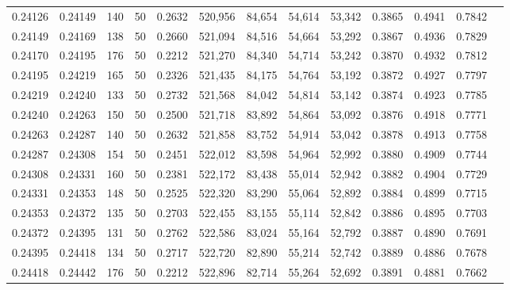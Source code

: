 \begin{tabular}{rrrrrrrrrrrrr}
0.24126 & 0.24149 &   140 &  50 &                                     0.2632 & 520,956 &  84,654 &  54,614 &  53,342 & 0.3865 & 0.4941 & 0.7842 \\
0.24149 & 0.24169 &   138 &  50 &                                     0.2660 & 521,094 &  84,516 &  54,664 &  53,292 & 0.3867 & 0.4936 & 0.7829 \\
0.24170 & 0.24195 &   176 &  50 &                                     0.2212 & 521,270 &  84,340 &  54,714 &  53,242 & 0.3870 & 0.4932 & 0.7812 \\
0.24195 & 0.24219 &   165 &  50 &                                     0.2326 & 521,435 &  84,175 &  54,764 &  53,192 & 0.3872 & 0.4927 & 0.7797 \\
0.24219 & 0.24240 &   133 &  50 &                                     0.2732 & 521,568 &  84,042 &  54,814 &  53,142 & 0.3874 & 0.4923 & 0.7785 \\
0.24240 & 0.24263 &   150 &  50 &                                     0.2500 & 521,718 &  83,892 &  54,864 &  53,092 & 0.3876 & 0.4918 & 0.7771 \\
0.24263 & 0.24287 &   140 &  50 &                                     0.2632 & 521,858 &  83,752 &  54,914 &  53,042 & 0.3878 & 0.4913 & 0.7758 \\
0.24287 & 0.24308 &   154 &  50 &                                     0.2451 & 522,012 &  83,598 &  54,964 &  52,992 & 0.3880 & 0.4909 & 0.7744 \\
0.24308 & 0.24331 &   160 &  50 &                                     0.2381 & 522,172 &  83,438 &  55,014 &  52,942 & 0.3882 & 0.4904 & 0.7729 \\
0.24331 & 0.24353 &   148 &  50 &                                     0.2525 & 522,320 &  83,290 &  55,064 &  52,892 & 0.3884 & 0.4899 & 0.7715 \\
0.24353 & 0.24372 &   135 &  50 &                                     0.2703 & 522,455 &  83,155 &  55,114 &  52,842 & 0.3886 & 0.4895 & 0.7703 \\
0.24372 & 0.24395 &   131 &  50 &                                     0.2762 & 522,586 &  83,024 &  55,164 &  52,792 & 0.3887 & 0.4890 & 0.7691 \\
0.24395 & 0.24418 &   134 &  50 &                                     0.2717 & 522,720 &  82,890 &  55,214 &  52,742 & 0.3889 & 0.4886 & 0.7678 \\
0.24418 & 0.24442 &   176 &  50 &                                     0.2212 & 522,896 &  82,714 &  55,264 &  52,692 & 0.3891 & 0.4881 & 0.7662 \\

\end{tabular}
